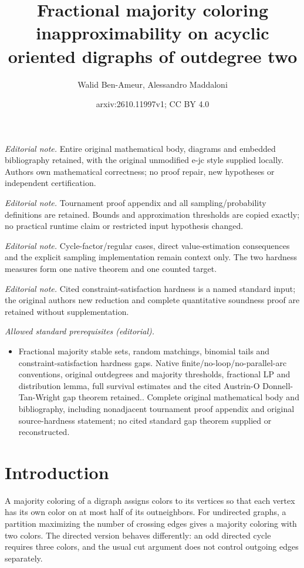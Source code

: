 \documentclass[10pt,a4paper]{article}
\title{Fractional majority coloring inapproximability on acyclic oriented digraphs of outdegree two}
\author{Walid Ben-Ameur, Alessandro Maddaloni}
\date{arxiv:2610.11997v1; CC BY 4.0}
\begin{document}
\maketitle
\noindent\textit{Editorial note.} Entire original mathematical body, diagrams and embedded bibliography retained, with the original unmodified e-jc style supplied locally. Authors own mathematical correctness; no proof repair, new hypotheses or independent certification.\par\medskip
\noindent\textit{Editorial note.} Tournament proof appendix and all sampling/probability definitions are retained. Bounds and approximation thresholds are copied exactly; no practical runtime claim or restricted input hypothesis changed.\par\medskip
\noindent\textit{Editorial note.} Cycle-factor/regular cases, direct value-estimation consequences and the explicit sampling implementation remain context only. The two hardness measures form one native theorem and one counted target.\par\medskip
\noindent\textit{Editorial note.} Cited constraint-satisfaction hardness is a named standard input; the original authors new reduction and complete quantitative soundness proof are retained without supplementation.\par\medskip
\noindent\textit{Allowed standard prerequisites (editorial).}\begin{itemize}
\item Fractional majority stable sets, random matchings, binomial tails and constraint-satisfaction hardness gaps. Native finite/no-loop/no-parallel-arc conventions, original outdegrees and majority thresholds, fractional LP and distribution lemma, full survival estimates and the cited Austrin-O Donnell-Tan-Wright gap theorem retained.. Complete original mathematical body and bibliography, including nonadjacent tournament proof appendix and original source-hardness statement; no cited standard gap theorem supplied or reconstructed.
\end{itemize}\medskip
\section{Introduction}
A majority coloring of a digraph assigns colors to its vertices so that each vertex has its own color on at most half of its outneighbors. For undirected graphs, a partition maximizing the number of crossing edges gives a majority coloring with two colors. The directed version behaves differently: an odd directed cycle requires three colors, and the usual cut argument does not control outgoing edges separately.
\end{document}
